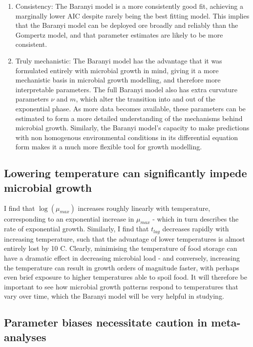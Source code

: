 \documentclass[11pt, a4paper]{article}
\begin{document}
\begin{linenumbers}
\begin{enumerate}


\item{Consistency: }
The Baranyi model is a more consistently good fit, achieving a marginally lower AIC despite rarely being the best fitting model. This implies that the Baranyi model can be deployed ore broadly and reliably than the Gompertz model, and that parameter estimates are likely to be more consistent.

\item{Truly mechanistic: }
The Baranyi model has the advantage that it was formulated entirely with microbial growth in mind, giving it a more mechanistic basis in microbial growth modelling, and therefore more interpretable parameters. The full Baranyi model also has extra curvature parameters $\nu$ and $m$, which alter the transition into and out of the exponential phase. As more data becomes available, these parameters can be estimated to form a more detailed understanding of the mechanisms behind microbial growth. Similarly, the Baranyi model's capacity to make predictions with non homogenous environmental conditions in its differential equation form makes it a much more flexible tool for growth modelling. 

 \end{enumerate}

\subsection{Lowering temperature can significantly impede microbial growth}

I find that $\log(\mu_{max})$ increases roughly linearly with temperature, corresponding to an exponential increase in $\mu_{max}$  - which in turn describes the rate of exponential growth. Similarly, I find that $t_{lag}$ decreases rapidly with increasing temperature, such that the advantage of lower temperatures is almost entirely lost by 10 \degree C. Clearly, minimising the temperature of food storage can have a dramatic effect in decreasing microbial load - and conversely, increasing the temperature can result in growth orders of magnitude faster, with perhaps even brief exposure to higher temperatures able to spoil food. It will therefore be important to see how microbial growth patterns respond to temperatures that vary over time, which the Baranyi model will be very helpful in studying.

\subsection{Parameter biases necessitate caution in meta-analyses}


\end{linenumbers}
\end{document}

